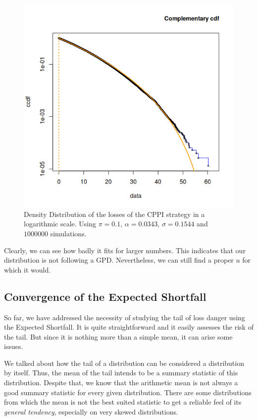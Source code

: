 \begin{figure}[H]
    \centering
    \includegraphics[scale=0.75]{images/cppi-ccdf-0.png}
    \caption{Density Distribution of the losses of the CPPI strategy in a logarithmic scale. Using $\pi = 0.1$, $\alpha = 0.0343$, $\sigma = 0.1544$ and $1000000$ simulations.}
    \label{fig:cppi-ccdf-0}
\end{figure}

Clearly, we can see how badly it fits for larger numbers. This indicates that our distribution is not following a GPD. Nevertheless, we can still find a proper $u$ for which it would.




\subsection{Convergence of the Expected Shortfall}

So far, we have addressed the necessity of studying the tail of loss danger using the Expected Shortfall. It is quite straightforward and it easily assesses the risk of the tail. But since it is nothing more than a simple mean, it can arise some issues. 

We talked about how the tail of a distribution can be considered a distribution by itself. Thus, the mean of the tail intends to be a summary statistic of this distribution. Despite that, we know that the arithmetic mean is not always a good summary statistic for every given distribution. There are some distributions from which the mean is not the best suited statistic to get a reliable feel of its \emph{general tendency}, especially on very skewed distributions.

